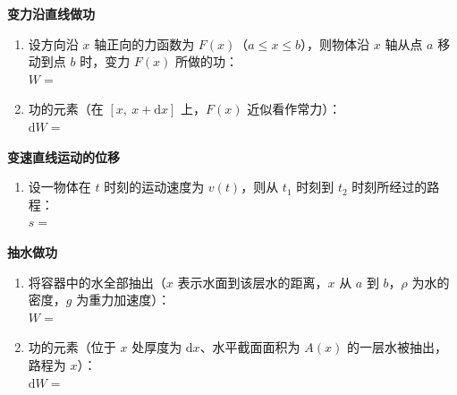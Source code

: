 \documentclass[a4paper,12pt]{article}
\begin{document}
    \pagestyle{empty}

    \begin{minipage}[t]{0.46\textwidth}
        \textbf{变力沿直线做功}
        \begin{enumerate}[label=(\arabic*), leftmargin=2em, itemsep=1.2em]
            \item 设方向沿 $x$ 轴正向的力函数为 $F(x)$（$a \le x \le b$），则物体沿 $x$ 轴从点 $a$ 移动到点 $b$ 时，变力 $F(x)$ 所做的功：\\[1.5em] $W = $\vspace{2.2em}
            \item 功的元素（在 $[x,\ x+\mathrm{d}x]$ 上，$F(x)$ 近似看作常力）：\\[1.5em] $\mathrm{d}W = $\vspace{2.2em}
        \end{enumerate}

        \textbf{变速直线运动的位移}
        \begin{enumerate}[label=(\arabic*), leftmargin=2em, itemsep=1.2em]
            \item 设一物体在 $t$ 时刻的运动速度为 $v(t)$，则从 $t_1$ 时刻到 $t_2$ 时刻所经过的路程：\\[1.5em] $s = $\vspace{2.2em}
        \end{enumerate}

        \textbf{抽水做功}
        \begin{enumerate}[label=(\arabic*), leftmargin=2em, itemsep=1.2em]
            \item 将容器中的水全部抽出（$x$ 表示水面到该层水的距离，$x$ 从 $a$ 到 $b$，$\rho$ 为水的密度，$g$ 为重力加速度）：\\[1.5em] $W = $\vspace{2.2em}
            \item 功的元素（位于 $x$ 处厚度为 $\mathrm{d}x$、水平截面面积为 $A(x)$ 的一层水被抽出，路程为 $x$）：\\[1.5em] $\mathrm{d}W = $\vspace{2.2em}
        \end{enumerate}
    \end{minipage}
    \hfill
\end{document}
